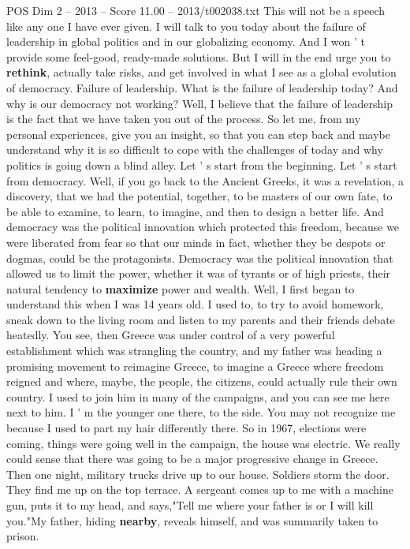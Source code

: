 \begin{textsample}{POS Dim 2 – 2013 – Score 11.00 – 2013/t002038.txt}  \label{ex:f2_pos_067}
This will not be a speech like any one I have ever given.
I will talk to you today about the failure of leadership in global politics and in our globalizing economy.
And I won ' t provide some feel-good, ready-made solutions.
But I will in the end urge you to \textbf{rethink}, actually take risks, and get involved in what I see as a global evolution of democracy.
Failure of leadership.
What is the failure of leadership today?
And why is our democracy not working?
Well, I believe that the failure of leadership is the fact that we have taken you out of the process.
So let me, from my personal experiences, give you an insight, so that you can step back and maybe understand why it is so difficult to cope with the challenges of today and why politics is going down a blind alley.
Let ' s start from the beginning.
Let ' s start from democracy.
Well, if you go back to the Ancient Greeks, it was a revelation, a discovery, that we had the potential, together, to be masters of our own fate, to be able to examine, to learn, to imagine, and then to design a better life.
And democracy was the political innovation which protected this freedom, because we were liberated from fear so that our minds in fact, whether they be despots or dogmas, could be the protagonists.
Democracy was the political innovation that allowed us to limit the power, whether it was of tyrants or of high priests, their natural tendency to \textbf{maximize} power and wealth.
Well, I first began to understand this when I was 14 years old.
I used to, to try to avoid homework, sneak down to the living room and listen to my parents and their friends debate heatedly.
You see, then Greece was under control of a very powerful establishment which was strangling the country, and my father was heading a promising movement to reimagine Greece, to imagine a Greece where freedom reigned and where, maybe, the people, the citizens, could actually rule their own country.
I used to join him in many of the campaigns, and you can see me here next to him.
I ' m the younger one there, to the side.
You may not recognize me because I used to part my hair differently there.
So in 1967, elections were coming, things were going well in the campaign, the house was electric.
We really could sense that there was going to be a major progressive change in Greece.
Then one night, military trucks drive up to our house.
Soldiers storm the door.
They find me up on the top terrace.
A sergeant comes up to me with a machine gun, puts it to my head, and says,"Tell me where your father is or I will kill you."My father, hiding \textbf{nearby}, reveals himself, and was summarily taken to prison.

\end{textsample}
